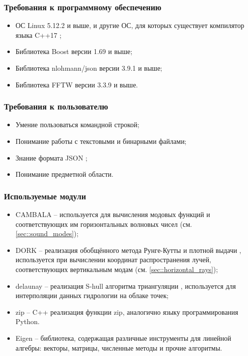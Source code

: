 \documentclass[../document.tex]{subfiles}
\begin{document}
            \subsubsection{Требования к программному обеспечению}
                \begin{itemize}
                    \item ОС Linux 5.12.2 и выше, и другие ОС, для которых существует компилятор языка C++17 \cite{c++};
                    \item Библиотека Boost \cite{boost} версии 1.69 и выше;
                    \item Библиотека nlohmann/json \cite{nlohmann} версии 3.9.1 и выше;
                    \item Библиотека FFTW \cite{fftw3,fftw05} версии 3.3.9 и выше.
                \end{itemize}
            \subsubsection{Требования к пользователю}
                \begin{itemize}
                    \item Умение пользоваться командной строкой;
                    \item Понимание работы с текстовыми и бинарными файлами;
                    \item Знание формата JSON \cite{json};
                    \item Понимание предметной области.
                \end{itemize}
            \subsubsection{Используемые модули}
                \begin{itemize}
                    \item CAMBALA \cite{cambala} -- используется для вычисления модовых функций и соответствующих им горизонтальных волновых чисел (см. \ref{sec::sound_modes});
                    \item DORK \cite{dork} -- реализация обобщённого метода Рунге-Кутты и плотной выдачи \cite{dense}, используется при вычислении координат распространения лучей, соответствующих вертикальным модам (см. \ref{sec::horizontal_rays});
                    \item delaunay \cite{delaunay} -- реализация S-hull алгоритма триангуляции \cite{shull}, используется для интерполяции данных гидрологии на облаке точек;
                    \item zip \cite{zip} -- C++ реализация функции zip, аналогично языку программирования Python.
                    \item Eigen \cite{eigenweb} -- библиотека, содержащая различные инструменты для линейной алгебры: векторы, матрицы, численные методы и прочие алгоритмы.
                \end{itemize}
\end{document}
